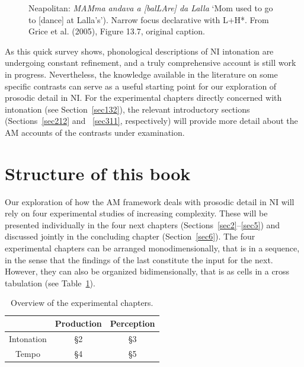 \begin{figure}
\centering
{}
\caption{Neapolitan: \textit{MAMma andava a [balLAre] da Lalla} `Mom used to go to [dance] at Lalla's'). Narrow focus declarative with L+H*. From Grice et al. (2005), Figure 13.7, original caption.}
\label{fig103}\end{figure}

As this quick survey shows, phonological descriptions of NI intonation are undergoing constant refinement, and a truly comprehensive account is still work in progress. Nevertheless, the knowledge available in the literature on some specific contrasts can serve as a useful starting point for our exploration of prosodic detail in NI. For the experimental chapters directly concerned with intonation (see Section~\ref{sec132}), the relevant introductory sections (Sections~\ref{sec212} and ~\ref{sec311}, respectively) will provide more detail about the AM accounts of the contrasts under examination.

\section{Structure of this book}\label{sec13}
Our exploration of how the AM framework deals with prosodic detail in NI will rely on four experimental studies of increasing complexity. These will be presented individually in the four next chapters (Sections~\ref{sec2}--\ref{sec5}) and discussed jointly in the concluding chapter (Section~\ref{sec6}). The four experimental chapters can be arranged monodimensionally, that is in a sequence, in the sense that the findings of the last constitute the input for the next. However, they can also be organized bidimensionally, that is as cells in a cross tabulation (see Table~\ref{tab11}).

\begin{table}[h]
\centering
\begin{tabular}{c | c c}
& Production & Perception\\
\hline
Intonation & §2 & §3\\
Tempo & §4 & §5
\end{tabular}
\caption{Overview of the experimental chapters.}
\label{tab11}\end{table}

